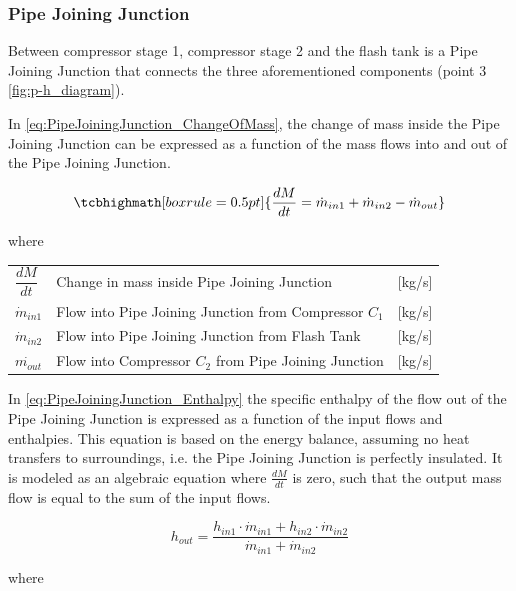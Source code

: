 \subsubsection{Pipe Joining Junction}
Between compressor stage 1, compressor stage 2 and the flash tank is a Pipe Joining Junction that connects the three aforementioned components (point 3 \cref{fig:p-h_diagram}).

In \cref{eq:PipeJoiningJunction_ChangeOfMass}, the change of mass inside the Pipe Joining Junction can be expressed as a function of the mass flows into and out of the Pipe Joining Junction.


\begin{equation}
	\tcbhighmath[boxrule = 0.5pt]{ \frac{dM}{dt} = \dot{m}_{in1} + \dot{m}_{in2} - \dot{m}_{out} }       \label{eq:PipeJoiningJunction_ChangeOfMass}
\end{equation}

where

\begin{center}
	\begin{tabular}{l p{8cm} l}
		$\dfrac{dM}{dt}$ & Change in mass inside Pipe Joining Junction             & [\si{kg}/\si{s}] \\
		$\dot{m}_{in1}$  & Flow into Pipe Joining Junction from Compressor $ C_1 $ & [\si{kg}/\si{s}] \\
		$\dot{m}_{in2}$  & Flow into Pipe Joining Junction from Flash Tank         & [\si{kg}/\si{s}] \\
		$\dot{m_{out}}$  & Flow into Compressor $ C_2 $ from Pipe Joining Junction & [\si{kg}/\si{s}]
	\end{tabular}
\end{center}

In \cref{eq:PipeJoiningJunction_Enthalpy} the specific enthalpy of the flow out of the Pipe Joining Junction is expressed as a function of the input flows and enthalpies. This equation is based on the energy balance, assuming no heat transfers to surroundings, i.e. the Pipe Joining Junction is perfectly insulated. It is modeled as an algebraic equation where $\frac{dM}{dt}$ is zero, such that the output mass flow is equal to the sum of the input flows.

\begin{equation} \label{eq:PipeJoiningJunction_Enthalpy}
	h_{out} = \frac{h_{in1} \cdot \dot{m}_{in1} + h_{in2} \cdot \dot{m}_{in2}}{ \dot{m}_{in1} + \dot{m}_{in2} }
\end{equation}

where

